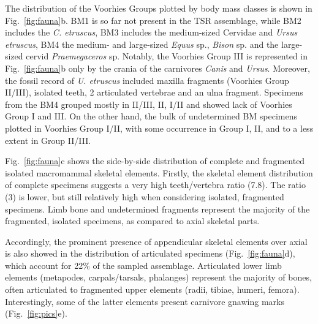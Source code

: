 \documentclass[5p,times,authoryear]{elsarticle}
\begin{document}
The distribution of the Voorhies Groups plotted by body mass classes is shown in Fig.~\ref{fig:fauna}b. BM1 is so far not present in the TSR assemblage, while BM2 includes the \emph{C. etruscus}, BM3 includes the medium-sized Cervidae and \emph{Ursus etruscus}, BM4 the medium- and large-sized \emph{Equus} sp., \emph{Bison} sp. and the large-sized cervid \emph{Praemegaceros} sp. Notably, the Voorhies Group III is represented in Fig.~\ref{fig:fauna}b only by the crania of the carnivores \emph{Canis} and \emph{Ursus}. Moreover, the fossil record of \emph{U. etruscus} included maxilla fragments (Voorhies Group II/III), isolated teeth, 2 articulated vertebrae and an ulna fragment. Specimens from the BM4 grouped mostly in II/III, II, I/II and showed lack of Voorhies Group I and III. On the other hand, the bulk of undetermined BM specimens plotted in Voorhies Group I/II, with some occurrence in Group I, II, and to a less extent in Group II/III.

Fig.~\ref{fig:fauna}c shows the side-by-side distribution of complete and fragmented isolated macromammal skeletal elements. Firstly, the skeletal element distribution of complete specimens suggests a very high teeth/vertebra ratio (7.8). The ratio (3) is lower, but still relatively high when considering isolated, fragmented specimens. Limb bone and undetermined fragments represent the majority of the fragmented, isolated specimens, as compared to axial skeletal parts.

Accordingly, the prominent presence of appendicular skeletal elements over axial is also showed in the distribution of articulated specimens (Fig.~\ref{fig:fauna}d), which account for 22\% of the sampled assemblage. Articulated lower limb elements (metapodes, carpals/tarsals, phalanges) represent the majority of bones, often articulated to fragmented upper elements (radii, tibiae, humeri, femora). Interestingly, some of the latter elements present carnivore gnawing marks (Fig.~\ref{fig:pics}e).
\end{document}
